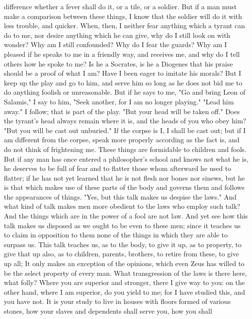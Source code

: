 \documentclass[a4paper]{article}
\begin{document}
difference whether a fever shall do it, or a tile, or a soldier. But if a man
must make a comparison between these things, I know that the soldier will do it
with less trouble, and quicker. When, then, I neither fear anything which a
tyrant can do to me, nor desire anything which he can give, why do I still look
on with wonder? Why am I still confounded? Why do I fear the guards? Why am I
pleased if he speaks to me in a friendly way, and receives me, and why do I
tell others how he spoke to me? Is he a Socrates, is he a Diogenes that his
praise should be a proof of what I am? Have I been eager to imitate his morals?
But I keep up the play and go to him, and serve him so long as he does not bid
me to do anything foolish or unreasonable. But if he says to me, "Go and bring
Leon of Salamis," I say to him, "Seek another, for I am no longer playing."
"Lead him away." I follow; that is part of the play. "But your head will be
taken off." Does the tyrant's head always remain where it is, and the heads of
you who obey him? "But you will be cast out unburied." If the corpse is I, I
shall be cast out; but if I am different from the corpse, speak more properly
according as the fact is, and do not think of frightening me. These things are
formidable to children and fools. But if any man has once entered a
philosopher's school and knows not what he is, he deserves to be full of fear
and to flatter those whom afterward he used to flatter; if he has not yet
learned that he is not flesh nor bones nor sinews, but he is that which makes
use of these parts of the body and governs them and follows the appearances of
things.
    "Yes, but this talk makes us despise the laws." And what kind of talk makes
men more obedient to the laws who employ such talk? And the things which are in
the power of a fool are not law. And yet see how this talk makes us disposed as
we ought to be even to these men; since it teaches us to claim in opposition to
them none of the things in which they are able to surpass us. This talk teaches
us, as to the body, to give it up, as to property, to give that up also, as to
children, parents, brothers, to retire from these, to give up all; It only
makes an exception of the opinions, which even Zeus has willed to be the select
property of every man. What transgression of the laws is there here, what
folly? Where you are superior and stronger, there I give way to you: on the
other hand, where I am superior, do you yield to me; for I have studied this,
and you have not. It is your study to live in houses with floors formed of
various stones, how your slaves and dependents shall serve you, how you shall
\end{document}
